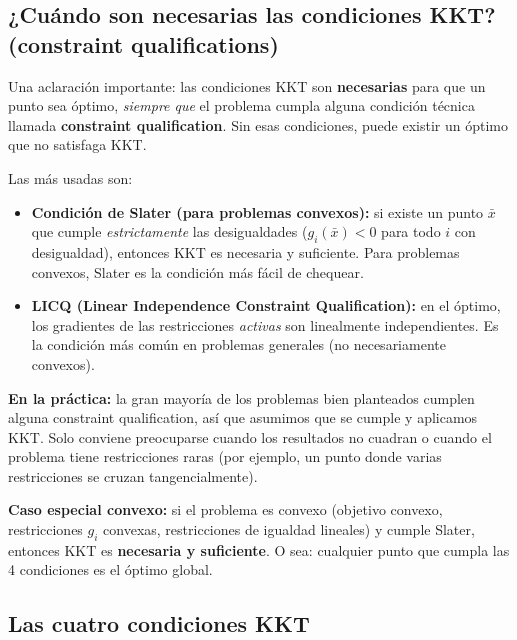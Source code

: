 \documentclass[12pt]{article}
\begin{document}
\subsection{¿Cuándo son necesarias las condiciones KKT? (constraint qualifications)}

Una aclaración importante: las condiciones KKT son \textbf{necesarias} para que un punto sea óptimo, \textit{siempre que} el problema cumpla alguna condición técnica llamada \textbf{constraint qualification}. Sin esas condiciones, puede existir un óptimo que no satisfaga KKT.

\vspace{0.5em}

Las más usadas son:

\begin{itemize}
    \item \textbf{Condición de Slater (para problemas convexos):} si existe un punto $\bar{x}$ que cumple \textit{estrictamente} las desigualdades ($g_i(\bar{x}) < 0$ para todo $i$ con desigualdad), entonces KKT es necesaria y suficiente. Para problemas convexos, Slater es la condición más fácil de chequear.
    \item \textbf{LICQ (Linear Independence Constraint Qualification):} en el óptimo, los gradientes de las restricciones \textit{activas} son linealmente independientes. Es la condición más común en problemas generales (no necesariamente convexos).
\end{itemize}

\vspace{0.5em}

\textbf{En la práctica:} la gran mayoría de los problemas bien planteados cumplen alguna constraint qualification, así que asumimos que se cumple y aplicamos KKT. Solo conviene preocuparse cuando los resultados no cuadran o cuando el problema tiene restricciones raras (por ejemplo, un punto donde varias restricciones se cruzan tangencialmente).

\vspace{0.5em}

\textbf{Caso especial convexo:} si el problema es convexo (objetivo convexo, restricciones $g_i$ convexas, restricciones de igualdad lineales) y cumple Slater, entonces KKT es \textbf{necesaria y suficiente}. O sea: cualquier punto que cumpla las 4 condiciones es el óptimo global.

\subsection{Las cuatro condiciones KKT}
\end{document}
